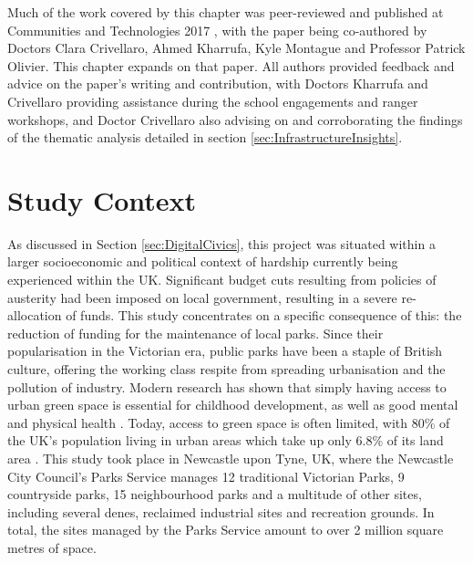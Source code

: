 Much of the work covered by this chapter was peer-reviewed and published at Communities and Technologies 2017 \citep{Richardson2017}, with the paper being co-authored by Doctors Clara Crivellaro, Ahmed Kharrufa, Kyle Montague and Professor Patrick Olivier. This chapter expands on that paper. All authors provided feedback and advice on the paper's writing and contribution, with Doctors Kharrufa and Crivellaro providing assistance during the school engagements and ranger workshops, and Doctor Crivellaro also advising on and corroborating the findings of the thematic analysis detailed in section \ref{sec:InfrastructureInsights}.

\section{Study Context}
\label{sec:ParkContext}
As discussed in Section \ref{sec:DigitalCivics}, this project was situated within a larger socioeconomic and political context of hardship currently being experienced within the UK. Significant budget cuts resulting from policies of austerity had been imposed on local government, resulting in a severe re-allocation of funds. This study concentrates on a specific consequence of this: the reduction of funding for the maintenance of local parks. Since their popularisation in the Victorian era, public parks have been a staple of British culture, offering the working class respite from spreading urbanisation and the pollution of industry. Modern research has shown that simply having access to urban green space is essential for childhood development, as well as good mental and physical health \citep{Fiennes2015}. Today, access to green space is often limited, with 80\% of the UK’s population living in urban areas which take up only 6.8\% of its land area \citep{UKNationalEcosystemAssesment2011}. This study took place in Newcastle upon Tyne, UK, where the Newcastle City Council's Parks Service manages 12 traditional Victorian Parks, 9 countryside parks, 15 neighbourhood parks and a multitude of other sites, including several denes, reclaimed industrial sites and recreation grounds. In total, the sites managed by the Parks Service amount to over 2 million square metres of space.

